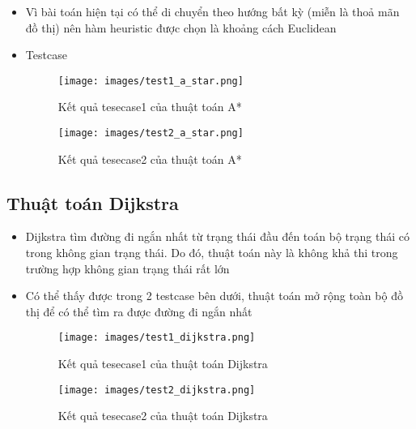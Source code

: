 \documentclass[a4paper, 12pt]{article}
\begin{document}
\begin{itemize}
        \item Vì bài toán hiện tại có thể di chuyển theo hướng bất kỳ (miễn là thoả mãn đồ thị) nên hàm heuristic được chọn là khoảng cách Euclidean
        \item Testcase
        \begin{figure}[H]
            \begin{center}
                \texttt{[image: images/test1\_a\_star.png]}
                \caption{Kết quả tesecase1 của thuật toán A*}
                \texttt{[image: images/test2\_a\_star.png]}
                \caption{Kết quả tesecase2 của thuật toán A*}
            \end{center}
        \end{figure}
    \end{itemize}

    \subsection{Thuật toán Dijkstra}
    \begin{itemize}
        \item Dijkstra tìm đường đi ngắn nhất từ trạng thái đầu đến toán bộ trạng thái có trong không gian trạng thái. Do đó, thuật toán này là không khả thi trong trường hợp không gian trạng thái rất lớn
        \item Có thể thấy được trong 2 testcase bên dưới, thuật toán mở rộng toàn bộ đồ thị để có thể tìm ra được đường đi ngắn nhất
        \begin{figure}[H]
            \begin{center}
                \texttt{[image: images/test1\_dijkstra.png]}
                \caption{Kết quả tesecase1 của thuật toán Dijkstra}
                \texttt{[image: images/test2\_dijkstra.png]}
                \caption{Kết quả tesecase2 của thuật toán Dijkstra}
            \end{center}
        \end{figure}
    \end{itemize}
\end{document}
